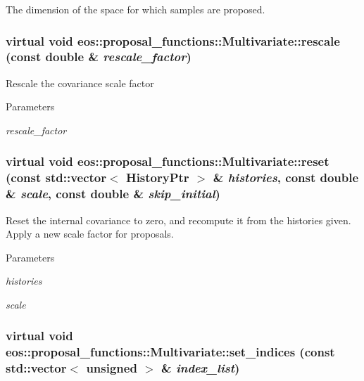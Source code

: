 The dimension of the space for which samples are proposed. \hypertarget{classeos_1_1proposal__functions_1_1Multivariate_a5f1d1b34460d12e1446dc5ff0fa714ee}{
\subsubsection[{rescale}]{\setlength{\rightskip}{0pt plus 5cm}virtual void eos::proposal\_\-functions::Multivariate::rescale (const double \& {\em rescale\_\-factor})}}
\label{classeos_1_1proposal__functions_1_1Multivariate_a5f1d1b34460d12e1446dc5ff0fa714ee}
Rescale the covariance scale factor 
\begin{DoxyParams}{Parameters}
\item[{\em rescale\_\-factor}]\end{DoxyParams}
\hypertarget{classeos_1_1proposal__functions_1_1Multivariate_a830b00fd34f3b65922eeef04d76269e9}{
\subsubsection[{reset}]{\setlength{\rightskip}{0pt plus 5cm}virtual void eos::proposal\_\-functions::Multivariate::reset (const std::vector$<$ {\bf HistoryPtr} $>$ \& {\em histories}, \/  const double \& {\em scale}, \/  const double \& {\em skip\_\-initial})}}
\label{classeos_1_1proposal__functions_1_1Multivariate_a830b00fd34f3b65922eeef04d76269e9}
Reset the internal covariance to zero, and recompute it from the histories given. Apply a new scale factor for proposals. 
\begin{DoxyParams}{Parameters}
\item[{\em histories}]\item[{\em scale}]\end{DoxyParams}
\hypertarget{classeos_1_1proposal__functions_1_1Multivariate_ac143e4c3d64075a86a6aa837d187d134}{
\subsubsection[{set\_\-indices}]{\setlength{\rightskip}{0pt plus 5cm}virtual void eos::proposal\_\-functions::Multivariate::set\_\-indices (const std::vector$<$ unsigned $>$ \& {\em index\_\-list})}}
